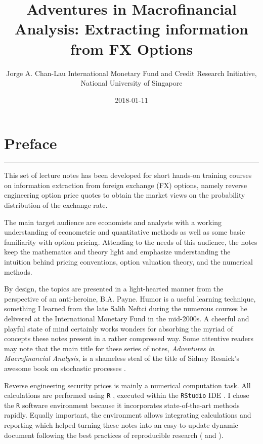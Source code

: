 \documentclass[]{book}
\title{Adventures in Macrofinancial Analysis: Extracting information from FX
Options}
\author{Jorge A. Chan-Lau International Monetary Fund and Credit Research
Initiative, National University of Singapore}
\date{2018-01-11}
\theoremstyle{definition}
\theoremstyle{definition}
\theoremstyle{definition}
\theoremstyle{remark}
\begin{document}
\maketitle

{
\setcounter{tocdepth}{1}
\tableofcontents
}
\chapter*{Preface}\label{preface}

\begin{center}\rule{0.5\linewidth}{\linethickness}\end{center}

This set of lecture notes has been developed for short hands-on training
courses on information extraction from foreign exchange (FX) options,
namely reverse engineering option price quotes to obtain the market
views on the probability distribution of the exchange rate.

The main target audience are economists and analysts with a working
understanding of econometric and quantitative methods as well as some
basic familiarity with option pricing. Attending to the needs of this
audience, the notes keep the mathematics and theory light and emphasize
understanding the intuition behind pricing conventions, option valuation
theory, and the numerical methods.

By design, the topics are presented in a light-hearted manner from the
perspective of an anti-heroine, B.A. Payne. Humor is a useful learning
technique, something I learned from the late Salih Neftci during the
numerous courses he delivered at the International Monetary Fund in the
mid-2000s. A cheerful and playful state of mind certainly works wonders
for absorbing the myriad of concepts these notes present in a rather
compressed way. Some attentive readers may note that the main title for
these series of notes, \emph{Adventures in Macrofinancial Analysis}, is
a shameless steal of the title of Sidney Resnick's awesome book on
stochastic processes \citep{Resnick1992}.

Reverse engineering security prices is mainly a numerical computation
task. All calculations are performed using \texttt{R} \citep{R-base},
executed within the \texttt{RStudio} IDE \citep{R-RStudio}. I chose the
\texttt{R} software environment because it incorporates state-of-the-art
methods rapidly. Equally important, the environment allows integrating
calculations and reporting which helped turning these notes into an
easy-to-update dynamic document following the best practices of
reproducible research (\citet{xie2015} and \citet{Gandrud2015}).
\end{document}
